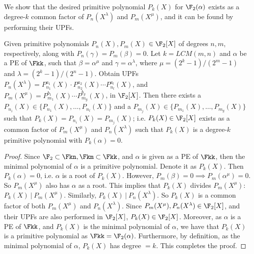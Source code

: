 We show that the desired primitive polynomial
$P_k(X)$ for $\F_2(\alpha)$ exists as a degree-$k$ common factor of
$P_n(X^{\lambda})$ and $P_m(X^{\mu})$, and it can be found by performing
their UPFs.

\begin{Theorem}\label{thm:Pk}
Given primitive polynomials $P_n(X), P_m(X)$ $\in \F_2[X]$ of degrees
$n,m$, respectively, along with $P_n(\gamma)= P_m(\beta)=0$. Let 
$k=LCM(m,n)$ and $\alpha$ be a PE of $\Fkk$, such that
$\beta=\alpha^\mu$ and $\gamma=\alpha^\lambda$, where
$\mu={(2^k-1)/(2^m-1)}$ and $\lambda={(2^k-1)/(2^n-1)}$. Obtain UPFs
$P_n(X^\lambda)=P_{n_1}^{a_1}(X)\cdot P_{n_2}^{a_2}(X)\cdots
P_{n_l}^{a_l}(X)$, and $P_{m}(X^\mu)=P_{m_1}^{b_1}(X)\cdots
P_{m_g}^{b_g}(X)$, in $\F_2[X]$. Then there exists a $P_{n_i}(X) \in
\{P_{n_1}(X),\dots,P_{n_l}(X)\}$ and a $P_{m_j} (X) \in
\{P_{m_1}(X),\dots,P_{m_g}(X)\}$ such that $P_k(X) = P_{n_i}(X) =
P_{m_j}(X)$; i.e. $P_k(X) \in \F_2[X]$ exists as a common factor of $P_m(X^\mu)$
and $P_n(X^\lambda)$ such that $P_k(X)$ is a degree-$k$ primitive polynomial 
with $P_{k}(\alpha)=0$.
\end{Theorem}

\begin{proof}
Since $\F_2 \subset \Fkn, \Fkm \subset \Fkk$, and
$\alpha$ is given as a PE of $\Fkk$, then the minimal polynomial of
$\alpha$ is a primitive polynomial. Denote it as $P_k(X)$. Then
$P_k(\alpha)=0$, i.e. $\alpha$ is a root of $P_k(X)$. However,
$P_m(\beta)=0 \implies P_m(\alpha^\mu)=0$. So $P_m(X^\mu)$ also has
$\alpha$ as a root. This implies that $P_k(X)$ divides $P_m(X^\mu)$:
$P_k(X) ~| ~ P_m(X^\mu)$. Similarly, $P_k(X) ~|~ P_n(X^\lambda)$. So
$P_k(X)$ is a common factor of both $P_m(X^\mu)$ and
$P_n(X^\lambda)$. Since $P_m(X^{\mu}), P_n(X^{\lambda}) \in \F_2[X]$,
and their UPFs are also performed in $\F_2[X]$, $P_k(X) \in
\F_2[X]$. Moreover, as $\alpha$ is a PE of $\Fkk$, and $P_k(X)$ is the
minimal polynomial of $\alpha$, we have that $P_k(X)$ is a primitive
polynomial as $\Fkk = \F_2(\alpha)$. Furthermore, by definition, as
the minimal polynomial of $\alpha$, $P_k(X)$ has degree
$=k$. This completes the proof. 
\end{proof}


